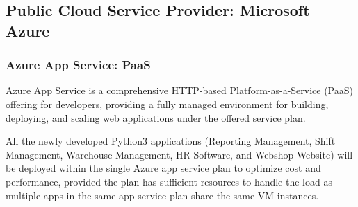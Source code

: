 \documentclass{llncs}
\begin{document}
\subsection{Public Cloud Service Provider: Microsoft Azure}
\subsubsection{Azure App Service: PaaS \cite{AppServiceplan}} \leavevmode\newline
Azure App Service is a comprehensive HTTP-based  Platform-as-a-Service (PaaS) offering for developers, providing a fully managed environment for building, deploying, and scaling web applications under the offered service plan.

All the newly developed Python3 applications (Reporting Management, Shift Management, Warehouse Management, HR Software, and Webshop Website) will be deployed within the single Azure app service plan to optimize cost and performance, provided the plan has sufficient resources to handle the load as multiple apps in the same app service plan share the same VM instances.
\end{document}
